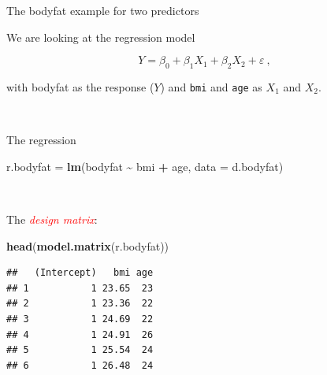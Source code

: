 \documentclass[
  10pt,
  ignorenonframetext,
]{beamer}
\newenvironment{Shaded}{\begin{snugshade}}{\end{snugshade}}
\newcommand{\AttributeTok}[1]{\textcolor[rgb]{0.13,0.29,0.53}{#1}}
\newcommand{\FunctionTok}[1]{\textcolor[rgb]{0.13,0.29,0.53}{\textbf{#1}}}
\newcommand{\NormalTok}[1]{#1}
\newcommand{\OtherTok}[1]{\textcolor[rgb]{0.56,0.35,0.01}{#1}}
\newcommand{\SpecialCharTok}[1]{\textcolor[rgb]{0.81,0.36,0.00}{\textbf{#1}}}
\begin{document}
\begin{frame}[fragile]
\begin{block}{The bodyfat example for two predictors}
\protect\hypertarget{the-bodyfat-example-for-two-predictors}{}
\(~\)

We are looking at the regression model

\begin{equation*}
Y = \beta_0 + \beta_{1}  X_1 + \beta_2 X_2  + \varepsilon \ ,
\end{equation*}

with bodyfat as the response (\(Y\)) and \texttt{bmi} and \texttt{age}
as \(X_1\) and \(X_2\).

\(~\)

\normalsize

The regression

\scriptsize

\begin{Shaded}
\begin{Highlighting}[]
\NormalTok{r.bodyfat }\OtherTok{=} \FunctionTok{lm}\NormalTok{(bodyfat }\SpecialCharTok{\textasciitilde{}}\NormalTok{ bmi }\SpecialCharTok{+}\NormalTok{ age, }\AttributeTok{data =}\NormalTok{ d.bodyfat)}
\end{Highlighting}
\end{Shaded}

\(~\)

\normalsize

The \emph{\textcolor{red}{design matrix}}:

\scriptsize

\begin{Shaded}
\begin{Highlighting}[]
\FunctionTok{head}\NormalTok{(}\FunctionTok{model.matrix}\NormalTok{(r.bodyfat))}
\end{Highlighting}
\end{Shaded}

\begin{verbatim}
##   (Intercept)   bmi age
## 1           1 23.65  23
## 2           1 23.36  22
## 3           1 24.69  22
## 4           1 24.91  26
## 5           1 25.54  24
## 6           1 26.48  24
\end{verbatim}

\normalsize
\end{block}
\end{frame}
\end{document}
